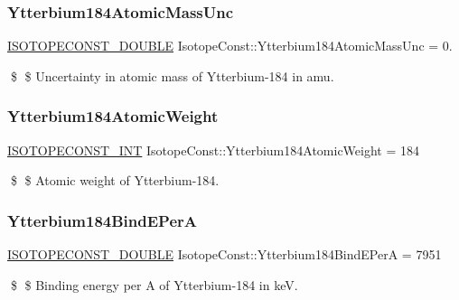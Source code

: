 \subsubsection{\texorpdfstring{Ytterbium184\+Atomic\+Mass\+Unc}{Ytterbium184AtomicMassUnc}}
{\footnotesize\ttfamily \mbox{\hyperlink{group___isotope_const-_macros_ga8f45a7272ce02c0b4c65c44636ed719a}{I\+S\+O\+T\+O\+P\+E\+C\+O\+N\+S\+T\+\_\+\+D\+O\+U\+B\+LE}} Isotope\+Const\+::\+Ytterbium184\+Atomic\+Mass\+Unc = 0.}

\$ \$ Uncertainty in atomic mass of Ytterbium-\/184 in amu. \mbox{\label{group___isotope_const-_ytterbium-_yb184_ga9898caf4e12b7e987d639e0e9f840b2d}} 
\subsubsection{\texorpdfstring{Ytterbium184\+Atomic\+Weight}{Ytterbium184AtomicWeight}}
{\footnotesize\ttfamily \mbox{\hyperlink{group___isotope_const-_macros_ga5f18360b3e99483a35c32d789e62621c}{I\+S\+O\+T\+O\+P\+E\+C\+O\+N\+S\+T\+\_\+\+I\+NT}} Isotope\+Const\+::\+Ytterbium184\+Atomic\+Weight = 184}

\$ \$ Atomic weight of Ytterbium-\/184. \mbox{\label{group___isotope_const-_ytterbium-_yb184_ga95df41c9db2b1b13071678266b8db44d}} 
\subsubsection{\texorpdfstring{Ytterbium184\+Bind\+E\+PerA}{Ytterbium184BindEPerA}}
{\footnotesize\ttfamily \mbox{\hyperlink{group___isotope_const-_macros_ga8f45a7272ce02c0b4c65c44636ed719a}{I\+S\+O\+T\+O\+P\+E\+C\+O\+N\+S\+T\+\_\+\+D\+O\+U\+B\+LE}} Isotope\+Const\+::\+Ytterbium184\+Bind\+E\+PerA = 7951}

\$ \$ Binding energy per A of Ytterbium-\/184 in keV. \mbox{\label{group___isotope_const-_ytterbium-_yb184_ga81f4fbbcfc1e8e3f79eac48267a0c661}} 
